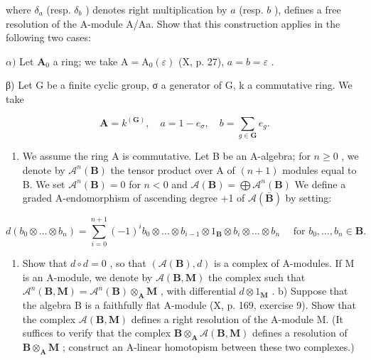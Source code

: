 where \(\delta_{a}\) (resp. \(\delta_{b}\) ) denotes right multiplication by \(a\) (resp. \(b\) ), defines a free resolution of the A-module A/Aa. Show that this construction applies in the following two cases:

\(\alpha)\) Let \(\mathbf{A}_0\) a ring; we take \(\mathrm{A} = \mathrm{A}_0(\varepsilon)\) (X, p. 27), \(a = b = \varepsilon\) .

β) Let G be a finite cyclic group, σ a generator of G, k a commutative ring. We take

\[
\mathbf {A} = k ^ {(\mathbf {G})}, \quad a = 1 - e _ {\sigma}, \quad b = \sum_ {g \in \mathbf {G}} e _ {g}.
\]

\begin{enumerate}
\def\labelenumi{\arabic{enumi})}
\setcounter{enumi}{1}
\tightlist
\item
  We assume the ring A is commutative. Let B be an A-algebra; for \(n \geqslant 0\) , we denote by \(\mathcal{A}^{n}(\mathbf{B})\) the tensor product over A of \((n + 1)\) modules equal to B. We set \(\mathcal{A}^{n}(\mathbf{B}) = 0\) for \(n < 0\) and \(\mathcal{A}(\mathbf{B}) = \bigoplus \mathcal{A}^{n}(\mathbf{B})\) We define a graded A-endomorphism of ascending degree +1 of \(\mathcal{A}(\bar{\mathbf{B}})\) by setting:
\end{enumerate}

\[
d (b _ {0} \otimes \dots \otimes b _ {n}) = \sum_ {i = 0} ^ {n + 1} (- 1) ^ {i} b _ {0} \otimes \dots \otimes b _ {i - 1} \otimes 1 _ {\mathbf {B}} \otimes b _ {i} \otimes \dots \otimes b _ {n} \quad \text { for } b _ {0}, \dots , b _ {n} \in \mathbf {B}.
\]

\begin{enumerate}
\def\labelenumi{\alph{enumi})}
\tightlist
\item
  Show that \(d \circ d = 0\) , so that \((\mathcal{A}(\mathbf{B}), d)\) is a complex of A-modules. If M is an A-module, we denote by \(\mathcal{A}(\mathbf{B}, \mathbf{M})\) the complex such that \(\mathcal{A}^{n}(\mathbf{B}, \mathbf{M}) = \mathcal{A}^{n}(\mathbf{B}) \otimes_{\mathbf{A}} \mathbf{M}\) , with differential \(d \otimes 1_{\mathbf{M}}\) . b) Suppose that the algebra B is a faithfully flat A-module (X, p. 169, exercise 9). Show that the complex \(\mathcal{A}(\mathbf{B}, \mathbf{M})\) defines a right resolution of the A-module M. (It suffices to verify that the complex \(\mathbf{B} \otimes_{\mathbf{A}} \mathcal{A}(\mathbf{B}, \mathbf{M})\) defines a resolution of \(\mathbf{B} \otimes_{\mathbf{A}} \mathbf{M}\) ; construct an A-linear homotopism between these two complexes.)
\end{enumerate}

